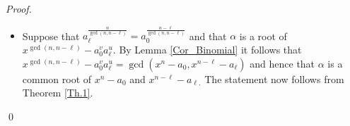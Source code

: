 \documentclass[12pt]{elsarticle}
\newcommand{\hlc}[2][yellow]{ {\sethlcolor{#1} \hl{#2}} }
\newcommand{\Fq}{\mathbb{F}_{q}}
\theoremstyle{break}
{\theorembodyfont{\upshape}
    \newtheorem{theorem}{Theorem}[section] %
    \newtheorem{lemma}[theorem]{Lemma} %
    \newtheorem{proposition}[theorem]{Proposition}
    \newtheorem{corollary}[theorem]{Corollary}
    \newtheorem{definition}[theorem]{Definition}
    \newtheorem{example}[theorem]{Example}
    \newtheorem{remark}[theorem]{Remark}
    \newtheorem{conjecture}[theorem]{Conjecture}
    \newtheorem*{proof}{{Proof}}
	\newtheorem*{notation}{Notation}
	\newtheorem*{main}{Cain Theorem}
	\newtheorem*{problem}{Problem}
}
\begin{document}
\begin{proof}
\begin{itemize}
  \item[(4) $\Rightarrow$ (1)] Suppose that 
  $ a_{\ell}^{\frac{n}{\gcd(n,n-\ell)}}=a_0^{\frac{n-\ell}{{\gcd(n,n-\ell)}}}$ and that $\alpha$ is a root of $x^{ \gcd(n,n-\ell)}-a_0^v a_{\ell}^u$. By Lemma \ref{Cor_Binomial} it follows that $x^{ \gcd(n,n-\ell)}-a_0^v a_{\ell}^u = \gcd(x^n-a_0, x^{n-\ell}-a_\ell)$ and hence that 
  $ \alpha $ is a common root of $ x^n-a_0 $ and $ x^{n-\ell}-a_{\ell.}$ The statement now follows from  Theorem \ref{Th.1}. 
 \end{itemize}
 \qed
 \end{proof}


\end{document}
